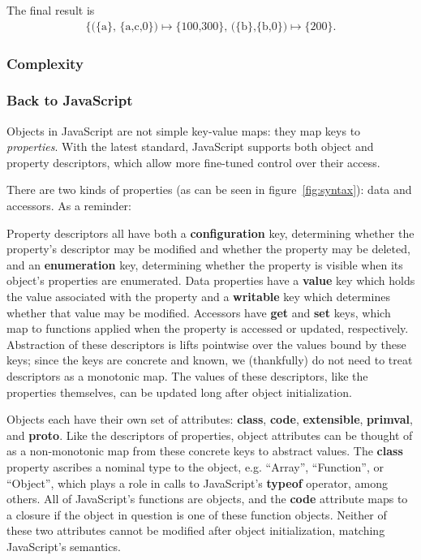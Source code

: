 \documentclass[preprint,9pt]{sigplanconf} %
\begin{document}
The final result is
\begin{align*}
\text{\{(\{a\}, \{a,c,0\})} \mapsto \text{\{100,300\},
  (\{b\},\{b,0\})} \mapsto \text{\{200\}}.
\end{align*}


\subsubsection{Complexity}


\subsubsection{Back to JavaScript}
Objects in JavaScript are not simple key-value maps: they map keys to
\emph{properties}. With the latest standard, JavaScript supports both
object and property descriptors, which allow more fine-tuned control
over their access.

There are two kinds of properties (as can be seen in
figure~\ref{fig:syntax}): data and accessors. As a reminder:

Property descriptors all have both a {\bf{configuration}} key, determining
whether the property's descriptor may be modified and whether the property may
be deleted, and an {\bf{enumeration}} key, determining whether the property is
visible when its object's properties are enumerated. Data properties have a
{\bf{value}} key which holds the value associated with the property and a
{\bf{writable}} key which determines whether that value may be
modified. Accessors have {\bf{get}} and {\bf{set}} keys, which map to functions
applied when the property is accessed or updated, respectively. Abstraction of
these descriptors is lifts pointwise over the values bound by these keys; since
the keys are concrete and known, we (thankfully) do not need to treat
descriptors as a monotonic map. The values of these descriptors, like the
properties themselves, can be updated long after object initialization.

Objects each have their own set of attributes: {\bf{class}},
{\bf{code}}, {\bf{extensible}}, {\bf{primval}}, and {\bf{proto}}. Like
the descriptors of properties, object attributes can be thought of as
a non-monotonic map from these concrete keys to abstract values. The
{\bf{class}} property ascribes a nominal type to the object,
e.g. ``Array'', ``Function'', or ``Object'', which plays a role in
calls to JavaScript's {\bf{typeof}} operator, among others. All of
JavaScript's functions are objects, and the {\bf{code}} attribute maps
to a closure if the object in question is one of these function
objects. Neither of these two attributes cannot be modified after
object initialization, matching JavaScript's semantics.
\end{document}
